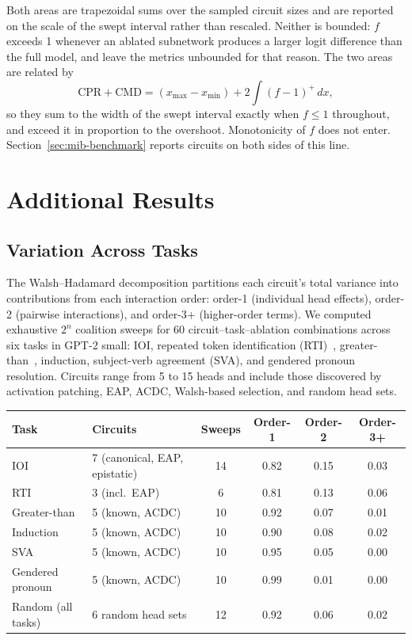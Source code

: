 \documentclass{article}
\begin{document}
Both areas are trapezoidal sums over the sampled circuit sizes and are
reported on the scale of the swept interval rather than rescaled.
Neither is bounded: $f$ exceeds 1 whenever an ablated subnetwork produces
a larger logit difference than the full model, and \citet{mueller2025mib}
leave the metrics unbounded for that reason. The two areas are related by
\begin{equation}
  \text{CPR} + \text{CMD} = (x_{\max} - x_{\min}) + 2\int (f - 1)^{+}\,dx,
  \label{eq:cpr-cmd}
\end{equation}
so they sum to the width of the swept interval exactly when $f \le 1$
throughout, and exceed it in proportion to the overshoot. Monotonicity of
$f$ does not enter. Section~\ref{sec:mib-benchmark} reports circuits on
both sides of this line.


\section{Additional Results}
\label{app:additional}


\subsection{Variation Across Tasks}
\label{sec:energy-spectrum}

The Walsh--Hadamard decomposition partitions each circuit's total
variance into contributions from each interaction order: order-1
(individual head effects), order-2 (pairwise interactions), and
order-3+ (higher-order terms). We computed exhaustive $2^n$ coalition
sweeps for 60 circuit--task--ablation combinations across six tasks in
GPT-2 small: IOI, repeated token identification
(RTI)~\citep{tower2025rti}, greater-than~\citep{hanna2023greater},
induction, subject-verb agreement (SVA), and gendered pronoun
resolution. Circuits range from 5 to 15 heads and include those
discovered by activation patching, EAP, ACDC, Walsh-based selection,
and random head sets.

\medskip

{\small
\begin{tabular}{llcccc}
\toprule
Task & Circuits & Sweeps & Order-1 & Order-2 & Order-3+ \\
\midrule
IOI            & 7 (canonical, EAP, epistatic) & 14 & 0.82 & 0.15 & 0.03 \\
RTI            & 3 (incl.\ EAP)               &  6 & 0.81 & 0.13 & 0.06 \\
Greater-than   & 5 (known, ACDC)               & 10 & 0.92 & 0.07 & 0.01 \\
Induction      & 5 (known, ACDC)               & 10 & 0.90 & 0.08 & 0.02 \\
SVA            & 5 (known, ACDC)               & 10 & 0.95 & 0.05 & 0.00 \\
Gendered pronoun & 5 (known, ACDC)             & 10 & 0.99 & 0.01 & 0.00 \\
\midrule
Random (all tasks) & 6 random head sets        & 12 & 0.92 & 0.06 & 0.02 \\
\bottomrule
\end{tabular}
}
\end{document}

